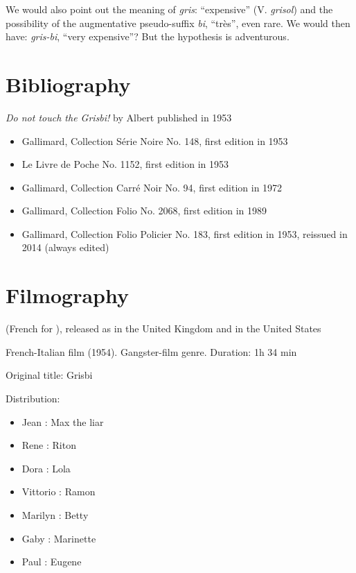 
We would also point out the meaning of \emph{gris}: ``expensive'' (V. \emph{grisol}) and the possibility of the augmentative pseudo-suffix \emph{bi}, ``très'', even rare. We would then have: \emph{gris-bi}, ``very expensive''? But the hypothesis is adventurous.


\section{Bibliography\label{preamble-biblio}}

\emph{Do not touch the Grisbi!} by Albert  published in 1953

\begin{itemize}
	\item Gallimard, Collection Série Noire No. 148, first edition in 1953
	\item Le Livre de Poche No. 1152, first edition in 1953
	\item Gallimard, Collection Carré Noir No. 94, first edition in 1972
	\item Gallimard, Collection Folio No. 2068, first edition in 1989
	\item Gallimard, Collection Folio Policier No. 183, first edition in 1953, reissued in 2014 (always edited)
\end{itemize}

\section{Filmography\label{preamble-filmography}}

 (French for ), released as  in the United Kingdom and  in the United States

French-Italian film (1954). Gangster-film genre. Duration: 1h 34 min

Original title: Grisbi

Distribution:

\begin{itemize}
    \item Jean : Max the liar
    \item Rene : Riton
    \item Dora : Lola
    \item Vittorio : Ramon
    \item Marilyn : Betty
    \item Gaby : Marinette
    \item Paul : Eugene
\end{itemize}

